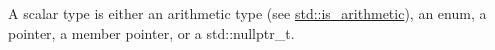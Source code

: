 A scalar type is either an arithmetic type (see \href{https://en.cppreference.com/w/cpp/types/is_arithmetic}{std::is\_arithmetic}), an enum, a pointer, a member pointer, or a std::nullptr\_t.